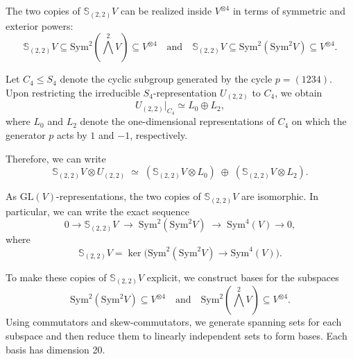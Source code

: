 \documentclass{amsart}
\begin{document}
The two copies of \(\mathbb{S}_{(2,2)} V\) can be realized inside \(V^{\otimes 4}\) in terms of symmetric and exterior powers:
\[
\mathbb{S}_{(2,2)} V \subseteq \mathrm{Sym}^2(\bigwedge^2 V) \subseteq V^{\otimes 4} \quad \text{and} \quad 
\mathbb{S}_{(2,2)} V \subseteq \mathrm{Sym}^2(\mathrm{Sym}^2 V) \subseteq V^{\otimes 4}.
\]

Let \( C_4 \leq S_4 \) denote the cyclic subgroup generated by the cycle $p = (1234)$. 
Upon restricting the irreducible \(S_4\)-representation \(U_{(2,2)}\) to \(C_4\), we obtain
\[
U_{(2,2)}\big|_{C_4} \simeq L_0 \oplus L_2,
\]
where \(L_0\) and \(L_2\) denote the one-dimensional representations of \(C_4\) on which the generator $p$ acts by \(1\) and \(-1\), respectively.
 
Therefore, we can write
\[
\mathbb{S}_{(2,2)}V \otimes U_{(2,2)}
\;\simeq\;
(\mathbb{S}_{(2,2)}V \otimes L_0)
\;\oplus\;
(\mathbb{S}_{(2,2)}V \otimes L_2).
\]

As $\mathrm{GL}(V)$-representations, the two copies of $\mathbb{S}_{(2,2)} V$ are isomorphic. In particular, we can write the exact sequence
\[
0 \longrightarrow \mathbb{S}_{(2,2)}V \;\longrightarrow\; \mathrm{Sym}^2(\mathrm{Sym}^2 V) \;\longrightarrow\; \mathrm{Sym}^4(V) \longrightarrow 0,
\]
where
\[
\mathbb{S}_{(2,2)} V = \ker\big(\mathrm{Sym}^2(\mathrm{Sym}^2 V) \to \mathrm{Sym}^4(V)\big).
\]

To make these copies of $\mathbb{S}_{(2,2)}V$ explicit, we construct bases for the subspaces
\[
\mathrm{Sym}^2(\mathrm{Sym}^2 V) \subseteq V^{\otimes 4} \quad \text{and} \quad \mathrm{Sym}^2(\bigwedge^2 V) \subseteq V^{\otimes 4}.
\]
Using commutators and skew-commutators, we generate spanning sets for each subspace and then reduce them to linearly independent sets to form bases. Each basis has dimension 20. %
\end{document}
